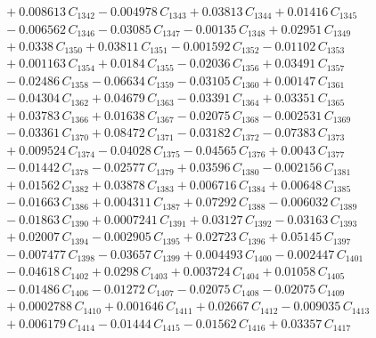 \documentclass[a4paper,11pt]{article}
\begin{document}
\begin{align}
&\quad + 0.008613\,C_{1342} - 0.004978\,C_{1343} + 0.03813\,C_{1344} + 0.01416\,C_{1345} \nonumber\\
&\quad - 0.006562\,C_{1346} - 0.03085\,C_{1347} - 0.00135\,C_{1348} + 0.02951\,C_{1349} \nonumber\\
&\quad + 0.0338\,C_{1350} + 0.03811\,C_{1351} - 0.001592\,C_{1352} - 0.01102\,C_{1353} \nonumber\\
&\quad + 0.001163\,C_{1354} + 0.0184\,C_{1355} - 0.02036\,C_{1356} + 0.03491\,C_{1357} \nonumber\\
&\quad - 0.02486\,C_{1358} - 0.06634\,C_{1359} - 0.03105\,C_{1360} + 0.00147\,C_{1361} \nonumber\\
&\quad - 0.04304\,C_{1362} + 0.04679\,C_{1363} - 0.03391\,C_{1364} + 0.03351\,C_{1365} \nonumber\\
&\quad + 0.03783\,C_{1366} + 0.01638\,C_{1367} - 0.02075\,C_{1368} - 0.002531\,C_{1369} \nonumber\\
&\quad - 0.03361\,C_{1370} + 0.08472\,C_{1371} - 0.03182\,C_{1372} - 0.07383\,C_{1373} \nonumber\\
&\quad + 0.009524\,C_{1374} - 0.04028\,C_{1375} - 0.04565\,C_{1376} + 0.0043\,C_{1377} \nonumber\\
&\quad - 0.01442\,C_{1378} - 0.02577\,C_{1379} + 0.03596\,C_{1380} - 0.002156\,C_{1381} \nonumber\\
&\quad + 0.01562\,C_{1382} + 0.03878\,C_{1383} + 0.006716\,C_{1384} + 0.00648\,C_{1385} \nonumber\\
&\quad - 0.01663\,C_{1386} + 0.004311\,C_{1387} + 0.07292\,C_{1388} - 0.006032\,C_{1389} \nonumber\\
&\quad - 0.01863\,C_{1390} + 0.0007241\,C_{1391} + 0.03127\,C_{1392} - 0.03163\,C_{1393} \nonumber\\
&\quad + 0.02007\,C_{1394} - 0.002905\,C_{1395} + 0.02723\,C_{1396} + 0.05145\,C_{1397} \nonumber\\
&\quad - 0.007477\,C_{1398} - 0.03657\,C_{1399} + 0.004493\,C_{1400} - 0.002447\,C_{1401} \nonumber\\
&\quad - 0.04618\,C_{1402} + 0.0298\,C_{1403} + 0.003724\,C_{1404} + 0.01058\,C_{1405} \nonumber\\
&\quad - 0.01486\,C_{1406} - 0.01272\,C_{1407} - 0.02075\,C_{1408} - 0.02075\,C_{1409} \nonumber\\
&\quad + 0.0002788\,C_{1410} + 0.001646\,C_{1411} + 0.02667\,C_{1412} - 0.009035\,C_{1413} \nonumber\\
&\quad + 0.006179\,C_{1414} - 0.01444\,C_{1415} - 0.01562\,C_{1416} + 0.03357\,C_{1417} \nonumber\\

\end{align}
\end{document}
